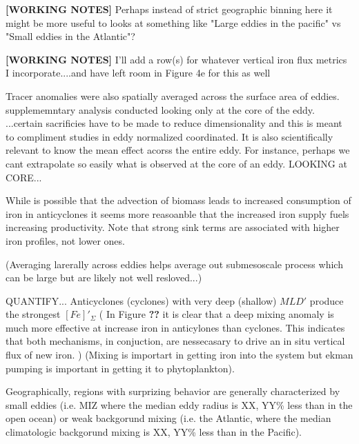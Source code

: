 \textbf{[WORKING NOTES]} Perhaps instead of strict geographic binning here it might be more useful to looks at something like "Large eddies in the pacific" vs "Small eddies in the Atlantic"?  

\textbf{[WORKING NOTES]} I'll add a row(s) for whatever vertical iron flux metrics I incorporate....and have left room in Figure 4e for this as well


 Tracer anomalies were also spatially averaged across the surface area of eddies. supplememntary analysis conducted looking only at the core of the eddy.  ...certain sacrificies have to be made to reduce dimensionality and this is meant to compliment studies in eddy normalized coordinated.  It is also scientifically relevant to know the mean effect acorss the entire eddy.  For instance, perhaps we cant extrapolate so easily what is observed at the core of an eddy.  LOOKING at CORE...
 
 While is possible that the advection of biomass leads to increased consumption of iron in anticyclones it seems more reasoanble that the increased iron supply fuels increasing productivity.  Note that strong sink terms are associated with higher iron profiles, not lower ones. 
 
 (Averaging larerally across eddies helps average out submesoscale process which can be large \parencite{MahadevanCommentEddywind2008}  but are likely not well resloved...)
 
 QUANTIFY... Anticyclones (cyclones) with very deep (shallow) $MLD'$ produce the strongest $[Fe]'_\Sigma$ ( In Figure \textbf{??} it is clear that a deep mixing anomaly is much more effective at increase iron in anticylones than cyclones.  This indicates that both mechanisms, in conjuction, are nessecasary to drive an in situ vertical flux of new iron. ) (Mixing is importart in getting iron into the system but ekman pumping is important in getting it to phytoplankton).
   
     Geographically, regions with surprizing behavior are generally characterized by small eddies (i.e. MIZ where the median eddy radius is XX, YY\% less than in the open ocean) or weak backgorund mixing (i.e. the Atlantic, where the median  climatologic backgorund mixing is XX, YY\% less than in the Pacific).

